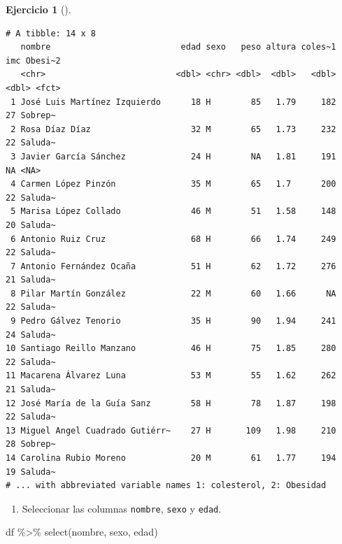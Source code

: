 \documentclass[
  a4paper,
]{scrreport}
\newenvironment{Shaded}{\begin{snugshade}}{\end{snugshade}}
\newcommand{\FunctionTok}[1]{\textcolor[rgb]{0.28,0.35,0.67}{#1}}
\newcommand{\NormalTok}[1]{\textcolor[rgb]{0.00,0.23,0.31}{#1}}
\newcommand{\SpecialCharTok}[1]{\textcolor[rgb]{0.37,0.37,0.37}{#1}}
\providecommand{\tightlist}{%
  \setlength{\itemsep}{0pt}\setlength{\parskip}{0pt}}\usepackage{longtable,booktabs,array}
\theoremstyle{definition}
\newtheorem{exercise}{Ejercicio}[chapter]
\theoremstyle{remark}
\begin{document}
\begin{exercise}[]
\begin{tcolorbox}
\begin{verbatim}
# A tibble: 14 x 8
   nombre                          edad sexo   peso altura coles~1   imc Obesi~2
   <chr>                          <dbl> <chr> <dbl>  <dbl>   <dbl> <dbl> <fct>  
 1 José Luis Martínez Izquierdo      18 H        85   1.79     182    27 Sobrep~
 2 Rosa Díaz Díaz                    32 M        65   1.73     232    22 Saluda~
 3 Javier García Sánchez             24 H        NA   1.81     191    NA <NA>   
 4 Carmen López Pinzón               35 M        65   1.7      200    22 Saluda~
 5 Marisa López Collado              46 M        51   1.58     148    20 Saluda~
 6 Antonio Ruiz Cruz                 68 H        66   1.74     249    22 Saluda~
 7 Antonio Fernández Ocaña           51 H        62   1.72     276    21 Saluda~
 8 Pilar Martín González             22 M        60   1.66      NA    22 Saluda~
 9 Pedro Gálvez Tenorio              35 H        90   1.94     241    24 Saluda~
10 Santiago Reillo Manzano           46 H        75   1.85     280    22 Saluda~
11 Macarena Álvarez Luna             53 M        55   1.62     262    21 Saluda~
12 José María de la Guía Sanz        58 H        78   1.87     198    22 Saluda~
13 Miguel Angel Cuadrado Gutiérr~    27 H       109   1.98     210    28 Sobrep~
14 Carolina Rubio Moreno             20 M        61   1.77     194    19 Saluda~
# ... with abbreviated variable names 1: colesterol, 2: Obesidad
\end{verbatim}

\end{tcolorbox}

\begin{enumerate}
\def\labelenumi{\alph{enumi}.}
\setcounter{enumi}{3}
\tightlist
\item
  Seleccionar las columnas \texttt{nombre}, \texttt{sexo} y
  \texttt{edad}.
\end{enumerate}

\begin{tcolorbox}[enhanced jigsaw, coltitle=black, breakable, bottomtitle=1mm, colbacktitle=quarto-callout-tip-color!10!white, rightrule=.15mm, opacityback=0, opacitybacktitle=0.6, left=2mm, colframe=quarto-callout-tip-color-frame, title=\textcolor{quarto-callout-tip-color}{\faLightbulb}\hspace{0.5em}{Solución}, toprule=.15mm, toptitle=1mm, arc=.35mm, colback=white, titlerule=0mm, bottomrule=.15mm, leftrule=.75mm]

\begin{Shaded}
\begin{Highlighting}[]
\NormalTok{df }\SpecialCharTok{\%\textgreater{}\%}
    \FunctionTok{select}\NormalTok{(nombre, sexo, edad)}
\end{Highlighting}
\end{Shaded}


\end{tcolorbox}
\end{exercise}
\end{document}
